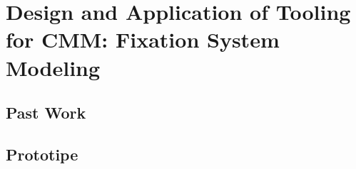 
%

\chapter{Design and Application of Tooling for CMM: Fixation System Modeling}
\label{cha:dig}

\section{Past Work}
\label{sec:pastfix}

\section{Prototipe}
\label{sec:proto}